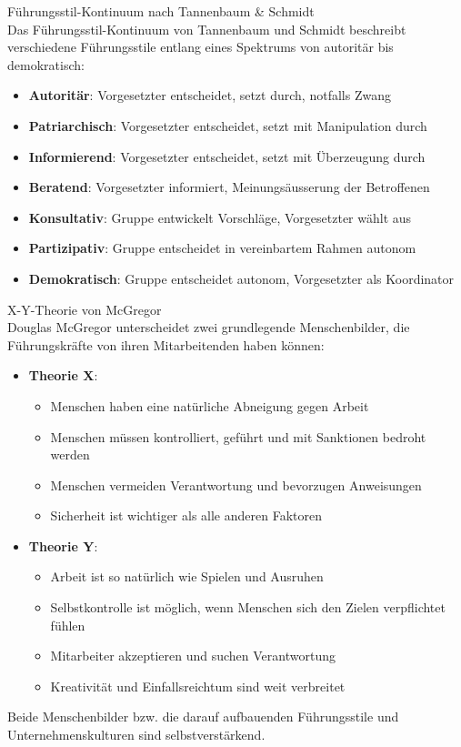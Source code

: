 \begin{concept}{Führungsstil-Kontinuum nach Tannenbaum \& Schmidt}\\
Das Führungsstil-Kontinuum von Tannenbaum und Schmidt beschreibt verschiedene Führungsstile entlang eines Spektrums von autoritär bis demokratisch:
\begin{itemize}
    \item \textbf{Autoritär}: Vorgesetzter entscheidet, setzt durch, notfalls Zwang
    \item \textbf{Patriarchisch}: Vorgesetzter entscheidet, setzt mit Manipulation durch
    \item \textbf{Informierend}: Vorgesetzter entscheidet, setzt mit Überzeugung durch
    \item \textbf{Beratend}: Vorgesetzter informiert, Meinungsäusserung der Betroffenen
    \item \textbf{Konsultativ}: Gruppe entwickelt Vorschläge, Vorgesetzter wählt aus
    \item \textbf{Partizipativ}: Gruppe entscheidet in vereinbartem Rahmen autonom
    \item \textbf{Demokratisch}: Gruppe entscheidet autonom, Vorgesetzter als Koordinator
\end{itemize}
\end{concept}

\begin{concept}{X-Y-Theorie von McGregor}\\
Douglas McGregor unterscheidet zwei grundlegende Menschenbilder, die Führungskräfte von ihren Mitarbeitenden haben können:
\begin{itemize}
    \item \textbf{Theorie X}:
    \begin{itemize}
        \item Menschen haben eine natürliche Abneigung gegen Arbeit
        \item Menschen müssen kontrolliert, geführt und mit Sanktionen bedroht werden
        \item Menschen vermeiden Verantwortung und bevorzugen Anweisungen
        \item Sicherheit ist wichtiger als alle anderen Faktoren
    \end{itemize}
    \item \textbf{Theorie Y}:
    \begin{itemize}
        \item Arbeit ist so natürlich wie Spielen und Ausruhen
        \item Selbstkontrolle ist möglich, wenn Menschen sich den Zielen verpflichtet fühlen
        \item Mitarbeiter akzeptieren und suchen Verantwortung
        \item Kreativität und Einfallsreichtum sind weit verbreitet
    \end{itemize}
\end{itemize}

Beide Menschenbilder bzw. die darauf aufbauenden Führungsstile und Unternehmenskulturen sind selbstverstärkend.
\end{concept}

